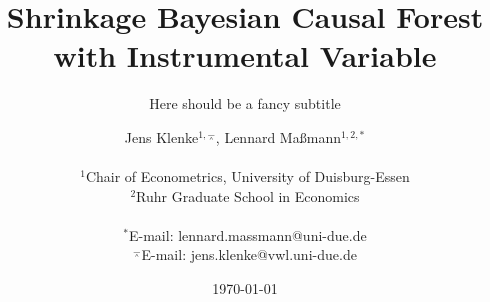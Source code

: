 \documentclass[oneside, english, reqno, 11pt, headsepline, BCOR=8.5mm]{scrbook} %
\title{Shrinkage Bayesian Causal Forest with Instrumental Variable}
\subtitle{Here should be a fancy subtitle}
\author
{Jens Klenke$^{1,\barwedge}$, Lennard Ma{\ss}mann$^{1,2,\ast}$ \\
\\
\normalsize{$^{1}$Chair of Econometrics, University of Duisburg-Essen}\\
\normalsize{$^{2}$Ruhr Graduate School in Economics}\\
\\
\normalsize{$^\ast$E-mail:  lennard.massmann@uni-due.de}\\
\normalsize{$^\barwedge$E-mail:  jens.klenke@vwl.uni-due.de}\\
}
\date{\today}
\numberwithin{equation}{section}
\numberwithin{figure}{section}
\theoremstyle{Theorem}
\theoremstyle{Definition}
\newcommand\summaryname{Abstract}
\newenvironment{Abstract}%
    {\small\begin{center}%
    \bfseries{\summaryname} \end{center}}
\begin{document}
\frontmatter
%
\maketitle


\cleardoublepage


\begin{Abstract}
\begin{changemargin}{1cm}{1cm}
Your text:\lipsum[10]
\end{changemargin}
\end{Abstract}

\cleardoublepage


\end{document}
